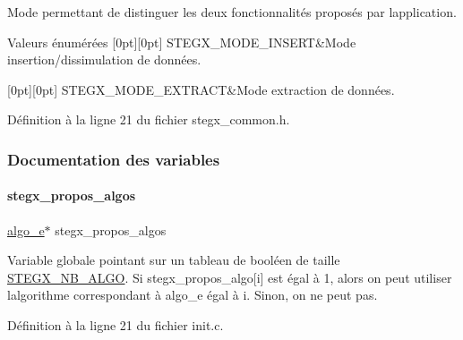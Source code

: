 Mode permettant de distinguer les deux fonctionnalités proposés par l\textquotesingle{}application. \begin{DoxyEnumFields}{Valeurs énumérées}
[0pt][0pt]{}\mbox{\label{a00008_a1a6b6fb557d8d37d59700faf4e4c9167a24551ca27f11d8f5a30e8de8d0df7f74}} 
S\+T\+E\+G\+X\+\_\+\+M\+O\+D\+E\+\_\+\+I\+N\+S\+E\+RT&Mode insertion/dissimulation de données. \\
\hline

[0pt][0pt]{}\mbox{\label{a00008_a1a6b6fb557d8d37d59700faf4e4c9167a7e0fef6b5363c352f9652457ddd6328f}} 
S\+T\+E\+G\+X\+\_\+\+M\+O\+D\+E\+\_\+\+E\+X\+T\+R\+A\+CT&Mode extraction de données. \\
\hline

\end{DoxyEnumFields}


Définition à la ligne 21 du fichier stegx\+\_\+common.\+h.



\subsubsection{Documentation des variables}
\mbox{\label{a00008_a855163fecb257950934ffba1b73ecae4}} 
\paragraph{\texorpdfstring{stegx\+\_\+propos\+\_\+algos}{stegx\_propos\_algos}}
{\footnotesize\ttfamily \hyperlink{a00008_adbe3e383e3f1c4239b26ccae2865aa06}{algo\+\_\+e}$\ast$ stegx\+\_\+propos\+\_\+algos}

Variable globale pointant sur un tableau de booléen de taille \hyperlink{a00008_ad3066b71c7c05f99ce6c3bd88da7ac23a6266bb55785ce37f799cb062cb11b2a4}{S\+T\+E\+G\+X\+\_\+\+N\+B\+\_\+\+A\+L\+GO}. Si stegx\+\_\+propos\+\_\+algo\mbox{[}i\mbox{]} est égal à 1, alors on peut utiliser l\textquotesingle{}algorithme correspondant à algo\+\_\+e égal à i. Sinon, on ne peut pas. 

Définition à la ligne 21 du fichier init.\+c.

